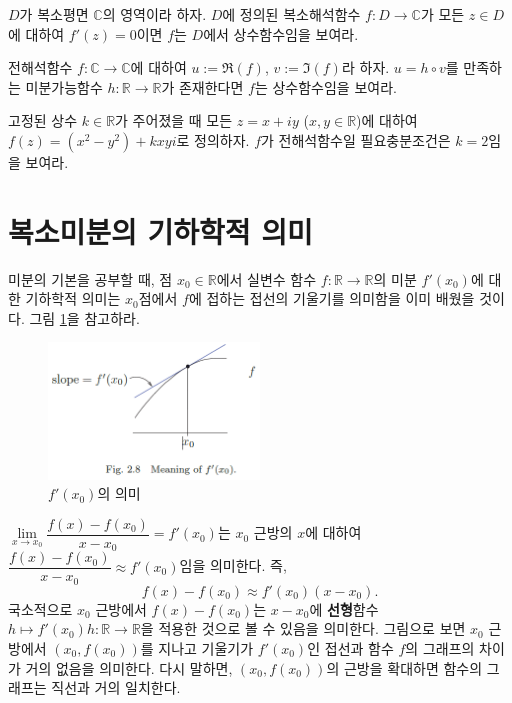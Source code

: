 \begin{salt_exercise} \label{ex-2-13}
$D$가 복소평면 $\mathbb C$의 영역이라 하자.
$D$에 정의된 복소해석함수 $f:D\to\mathbb C$가 
모든  $z\in D$에 대하여 $f'(z)=0$이면
$f$는 $D$에서 상수함수임을 보여라.
\end{salt_exercise}

\begin{salt_exercise} \label{ex-2-14}
전해석함수 $f:\mathbb C \to \mathbb C$에 대하여
$u:=\Re(f)$, $v:=\Im(f)$라 하자.
$u= h\circ v$를 만족하는 미분가능함수 $h:\mathbb R \to \mathbb R$가
존재한다면 $f$는 상수함수임을 보여라.
\end{salt_exercise}

\begin{salt_exercise} \label{ex-2-15}
고정된 상수 $k\in\mathbb R$가 주어졌을 때
모든 $z=x+iy$ ($x,y\in \mathbb R$)에 대하여 $f(z)=(x^2-y^2) +kxyi$로 정의하자.
$f$가 전해석함수일 필요충분조건은 $k=2$임을 보여라.
\end{salt_exercise}

\section{복소미분의 기하학적 의미}

미분의 기본을 공부할 때, 점 $x_0\in\mathbb R$에서 실변수 함수 $f:\mathbb R\to \mathbb R$의 
미분 $f'(x_0)$에 대한 기하학적 의미는 $x_0$점에서 $f$에 접하는 접선의 기울기를 의미함을
이미 배웠을 것이다. 그림 \ref{fig-2-8}을 참고하라.

\begin{figure}[!h]
\begin{center}
\includegraphics[width=0.5\textwidth]{./SaltChapter/fig-2-8}
\end{center}
\caption{$f'(x_0)$의 의미}
\label{fig-2-8}
\end{figure}

$\lim\limits_{x\to x_0} \dfrac{f(x) - f(x_0)}{x-x_0} = f'(x_0)$는
$x_0$ 근방의 $x$에 대하여
$\dfrac{f(x) - f(x_0)}{x-x_0} \approx f'(x_0)$임을 의미한다. 즉,
\[
f(x) - f(x_0) \approx f'(x_0)(x-x_0).
\]
국소적으로 $x_0$ 근방에서 $f(x)-f(x_0)$는 $x-x_0$에 {\bf 선형}함수 
$h \mapsto f'(x_0)h : \mathbb R \to \mathbb R$을 적용한 것으로 볼 수 있음을 의미한다.
그림으로 보면 $x_0$ 근방에서 
$(x_0, f(x_0))$를 지나고 기울기가 $f'(x_0)$인 접선과 함수 $f$의 그래프의 차이가 거의 없음을 
의미한다. 
다시 말하면, $(x_0, f(x_0))$의 근방을 확대하면   함수의 그래프는 직선과 거의 일치한다.

